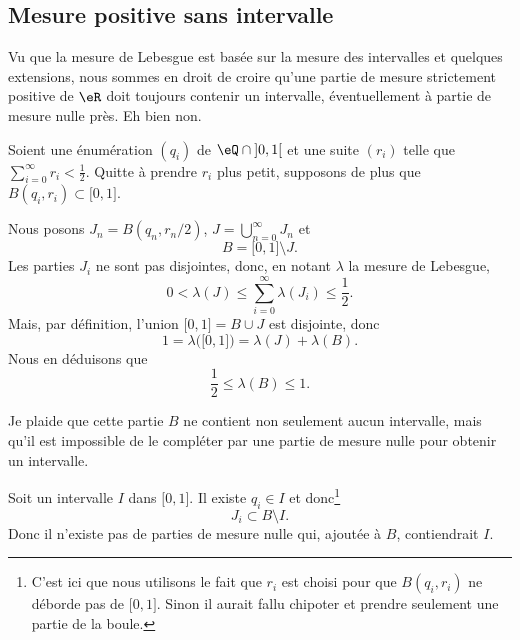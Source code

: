 \subsection{Mesure positive sans intervalle}

Vu que la mesure de Lebesgue est basée sur la mesure des intervalles et quelques extensions, nous sommes en droit de croire qu'une partie de mesure strictement positive de \( \eR\) doit toujours contenir un intervalle, éventuellement à partie de mesure nulle près. Eh bien non.

\begin{example}       \label{EXooVZVIooXZvDaE}
	Soient une énumération \( (q_i)\) de \( \eQ\cap\mathopen] 0 , 1 \mathclose[\) et une suite \( (r_i)\) telle que \( \sum_{i=0}^{\infty}r_i<\frac{ 1 }{2}\). Quitte à prendre \( r_i\) plus petit, supposons de plus que \( B(q_i,r_i)\subset \mathopen[ 0 , 1 \mathclose]\).

	Nous posons \( J_n=B(q_n,r_n/2)\), \( J=\bigcup_{n=0}^{\infty}J_n\) et
	\begin{equation}
		B=\mathopen[ 0 , 1 \mathclose]\setminus J.
	\end{equation}
	Les parties \( J_i\) ne sont pas disjointes, donc, en notant \( \lambda\) la mesure de Lebesgue,
	\begin{equation}
		0<\lambda(J)\leq \sum_{i=0}^{\infty}\lambda(J_i)\leq \frac{ 1 }{2}.
	\end{equation}
	Mais, par définition, l'union \( \mathopen[ 0 , 1 \mathclose]=B\cup J\) est disjointe, donc
	\begin{equation}
		1=\lambda\big( \mathopen[ 0 , 1 \mathclose] \big)=\lambda(J)+\lambda(B).
	\end{equation}
	Nous en déduisons que
	\begin{equation}
		\frac{ 1 }{2}\leq \lambda(B)\leq 1.
	\end{equation}

	Je plaide que cette partie \( B\) ne contient non seulement aucun intervalle, mais qu'il est impossible de le compléter par une partie de mesure nulle pour obtenir un intervalle.

	Soit un intervalle \( I\) dans \( \mathopen[ 0 , 1 \mathclose]\). Il existe \( q_i\in I\) et donc\footnote{C'est ici que nous utilisons le fait que \( r_i\) est choisi pour que \( B(q_i,r_i)\) ne déborde pas de \( \mathopen[ 0 , 1 \mathclose]\). Sinon il aurait fallu chipoter et prendre seulement une partie de la boule.}
	\begin{equation}
		J_i\subset B\setminus I.
	\end{equation}
	Donc il n'existe pas de parties de mesure nulle qui, ajoutée à \( B\), contiendrait \( I\).
\end{example}

